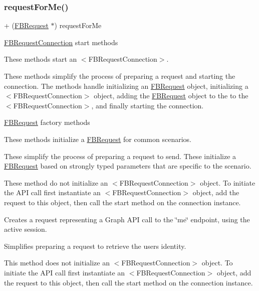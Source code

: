 \subsubsection{\texorpdfstring{request\+For\+Me()}{requestForMe()}\hspace{0.1cm}{\footnotesize\ttfamily [1/5]}}
{\footnotesize\ttfamily + (\hyperlink{interfaceFBRequest}{F\+B\+Request} $\ast$) request\+For\+Me \begin{DoxyParamCaption}{ }\end{DoxyParamCaption}}

\hyperlink{interfaceFBRequestConnection}{F\+B\+Request\+Connection} start methods

These methods start an $<$\+F\+B\+Request\+Connection$>$.

These methods simplify the process of preparing a request and starting the connection. The methods handle initializing an {\ttfamily \hyperlink{interfaceFBRequest}{F\+B\+Request}} object, initializing a $<$\+F\+B\+Request\+Connection$>$ object, adding the {\ttfamily \hyperlink{interfaceFBRequest}{F\+B\+Request}} object to the to the $<$\+F\+B\+Request\+Connection$>$, and finally starting the connection.

\hyperlink{interfaceFBRequest}{F\+B\+Request} factory methods

These methods initialize a {\ttfamily \hyperlink{interfaceFBRequest}{F\+B\+Request}} for common scenarios.

These simplify the process of preparing a request to send. These initialize a {\ttfamily \hyperlink{interfaceFBRequest}{F\+B\+Request}} based on strongly typed parameters that are specific to the scenario.

These method do not initialize an $<$\+F\+B\+Request\+Connection$>$ object. To initiate the A\+PI call first instantiate an $<$\+F\+B\+Request\+Connection$>$ object, add the request to this object, then call the {\ttfamily start} method on the connection instance.

Creates a request representing a Graph A\+PI call to the \char`\"{}me\char`\"{} endpoint, using the active session.

Simplifies preparing a request to retrieve the user\textquotesingle{}s identity.

This method does not initialize an $<$\+F\+B\+Request\+Connection$>$ object. To initiate the A\+PI call first instantiate an $<$\+F\+B\+Request\+Connection$>$ object, add the request to this object, then call the {\ttfamily start} method on the connection instance.

